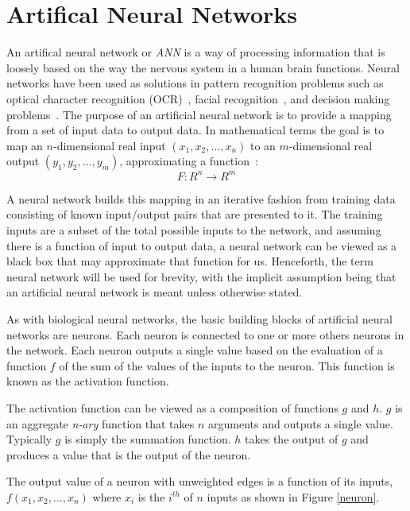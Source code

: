 \section{Artifical Neural Networks}
An artifical neural network or {\it ANN} is a way of processing
information that is loosely based on the way the nervous system in a
human brain functions.
Neural networks have been used as solutions in pattern recognition
problems such as optical character recognition (OCR)~\cite{ocr1,ocr2},
facial recognition~\cite{face},  and decision making problems~\cite{decisionMaking1,decisionMaking2}.
The purpose of an artificial neural network is to provide a mapping from a set of input data to output data. 
In mathematical terms the goal is to map an $n$-dimensional real input
$(x_1,x_2,\ldots,x_n)$ to an $m$-dimensional real output $(y_1,y_2,...,y_m)$, 
approximating a function~\cite[29-30]{rojas}: 
\begin{displaymath} F : R^n \rightarrow R^m\end{displaymath}

A neural network builds this mapping in an iterative fashion from training data consisting of known input/output pairs that are presented to it. 
The training inputs are a subset of the total possible inputs to the network, and assuming there is a function of input to output data, a neural network can be viewed as a black box that may approximate that function for us.
Henceforth, the term neural network will be used for brevity, with the implicit assumption being that an artificial neural network is meant unless otherwise stated.

As with biological neural networks, the basic building blocks of artificial neural networks are neurons. 
Each neuron is connected to one or more others neurons in the network. 
Each neuron outputs a single value based on the evaluation of a function $f$ of the sum of the values of the inputs to the neuron.
This function is known as the activation function.

The activation function can be viewed as a composition of functions
$g$ and $h$.
$g$ is an aggregate {\it n-ary} function that takes $n$ arguments and outputs a
single value.
Typically $g$ is simply the summation function.
$h$ takes the output of $g$ and produces a value that is the output of
the neuron. 

The output value of a neuron with unweighted edges is a function of
its inputs, $f(x_1, x_2,\ldots, x_n)$ where $x_i$ is the $i^{th}$ of $n$
inputs as shown in Figure \ref{neuron}.

